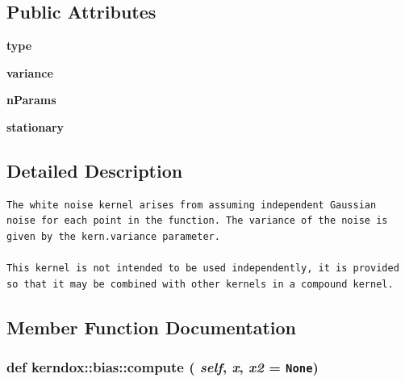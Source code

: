 \subsection*{Public Attributes}
\begin{CompactItemize}
\item 
\hypertarget{classkerndox_1_1bias_1b9e89a9037b0a6989d415b05ab1e850}{
\textbf{type}}
\label{classkerndox_1_1bias_1b9e89a9037b0a6989d415b05ab1e850}

\item 
\hypertarget{classkerndox_1_1bias_3a1192ad6f99f2067521d78c03b8c88e}{
\textbf{variance}}
\label{classkerndox_1_1bias_3a1192ad6f99f2067521d78c03b8c88e}

\item 
\hypertarget{classkerndox_1_1bias_9fddce667a3e211e3491028d0f856b5b}{
\textbf{nParams}}
\label{classkerndox_1_1bias_9fddce667a3e211e3491028d0f856b5b}

\item 
\hypertarget{classkerndox_1_1bias_a8cc3c35b1b54709709098a9e0ee27ce}{
\textbf{stationary}}
\label{classkerndox_1_1bias_a8cc3c35b1b54709709098a9e0ee27ce}

\end{CompactItemize}


\subsection{Detailed Description}


\footnotesize\begin{verbatim}The white noise kernel arises from assuming independent Gaussian
noise for each point in the function. The variance of the noise is
given by the kern.variance parameter.

This kernel is not intended to be used independently, it is provided
so that it may be combined with other kernels in a compound kernel.\end{verbatim}
\normalsize
 

\subsection{Member Function Documentation}
\hypertarget{classkerndox_1_1bias_378a35b6a66d06ae6275e7bb72496012}{
\subsubsection[{compute}]{\setlength{\rightskip}{0pt plus 5cm}def kerndox::bias::compute ( {\em self}, \/   {\em x}, \/   {\em x2} = {\tt None})}}
\label{classkerndox_1_1bias_378a35b6a66d06ae6275e7bb72496012}




